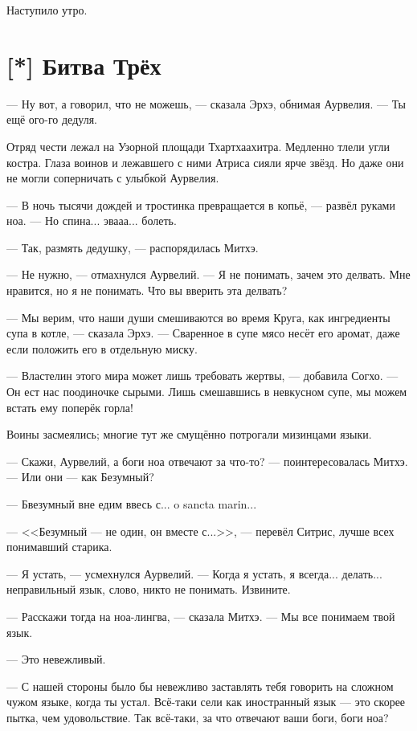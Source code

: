 Наступило утро.

\section{[*] Битва Трёх}

--- Ну вот, а говорил, что не можешь, --- сказала Эрхэ, обнимая Аурвелия.
--- Ты ещё ого-го дедуля.

Отряд чести лежал на Узорной площади Тхартхаахитра.
Медленно тлели угли костра.
Глаза воинов и лежавшего с ними Атриса сияли ярче звёзд.
Но даже они не могли соперничать с улыбкой Аурвелия.

--- В ночь тысячи дождей и тростинка превращается в копьё, --- развёл руками ноа.
--- Но спина... эвааа... болеть.

--- Так, размять дедушку, --- распорядилась Митхэ.

--- Не нужно, --- отмахнулся Аурвелий.
--- Я не понимать, зачем это делвать.
Мне нравится, но я не понимать.
Что вы вверить эта делвать?

--- Мы верим, что наши души смешиваются во время Круга, как ингредиенты супа в котле, --- сказала Эрхэ.
--- Сваренное в супе мясо несёт его аромат, даже если положить его в отдельную миску.

--- Властелин этого мира может лишь требовать жертвы, --- добавила Согхо.
--- Он ест нас поодиночке сырыми.
Лишь смешавшись в невкусном супе, мы можем встать ему поперёк горла!

Воины засмеялись;
многие тут же смущённо потрогали мизинцами языки.

--- Скажи, Аурвелий, а боги ноа отвечают за что-то? --- поинтересовалась Митхэ.
--- Или они --- как Безумный?

--- Бвезумный вне едим ввесь с... o sancta marin...

---  <<Безумный --- не один, он вместе с...>>, --- перевёл Ситрис, лучше всех понимавший старика.

--- Я устать, --- усмехнулся Аурвелий.
--- Когда я устать, я всегда... делать... неправильный язык, слово, никто не понимать.
Извините.

--- Расскажи тогда на ноа-лингва, --- сказала Митхэ.
--- Мы все понимаем твой язык.

--- Это невежливый.

--- С нашей стороны было бы невежливо заставлять тебя говорить на сложном чужом языке, когда ты устал.
Всё-таки сели как иностранный язык --- это скорее пытка, чем удовольствие.
Так всё-таки, за что отвечают ваши боги, боги ноа?

